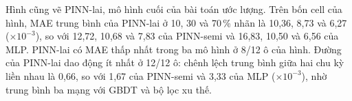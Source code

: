 Hình cũng vẽ PINN-lai, mô hình cuối của bài toán ước lượng. Trên bốn cell của hình, MAE trung bình của PINN-lai ở 10, 30 và 70\,\% nhãn là 10{,}36, 8{,}73 và 6{,}27 ($\times10^{-3}$), so với 12{,}72, 10{,}68 và 7{,}83 của PINN-semi và 16{,}83, 10{,}50 và 6{,}56 của MLP. PINN-lai có MAE thấp nhất trong ba mô hình ở 8/12 ô của hình. Đường của PINN-lai dao động ít nhất ở 12/12 ô: chênh lệch trung bình giữa hai chu kỳ liền nhau là 0{,}66, so với 1{,}67 của PINN-semi và 3{,}33 của MLP ($\times10^{-3}$), nhờ trung bình ba mạng với GBDT và bộ lọc xu thế.
